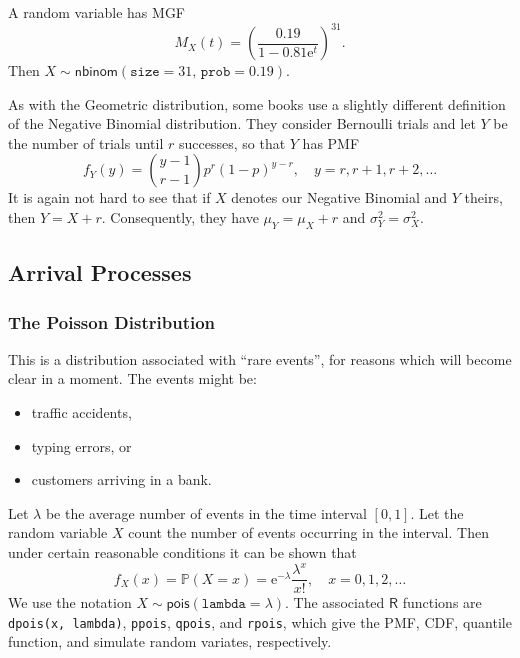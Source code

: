 \documentclass[captions=tableheading]{scrbook}
\begin{document}
\begin{example}
A random variable has MGF
\[
M_{X}(t)=\left(\frac{0.19}{1-0.81\mathrm{e}^{t}}\right)^{31}.
\]
Then \(X\sim\mathsf{nbinom}(\mathtt{size}=31,\,\mathtt{prob}=0.19)\).
\end{example}

\begin{note}
As with the Geometric distribution, some books use a slightly different definition of the Negative Binomial distribution. They consider Bernoulli trials and let \(Y\) be the number of trials until \(r\) successes, so that \(Y\) has PMF
\begin{equation}
f_{Y}(y)={y-1 \choose r-1}p^{r}(1-p)^{y-r},\quad y=r,r+1,r+2,\ldots
\end{equation}
It is again not hard to see that if \(X\) denotes our Negative Binomial and \(Y\) theirs, then \(Y=X+r\). Consequently, they have \(\mu_{Y}=\mu_{X}+r\) and \(\sigma_{Y}^{2}=\sigma_{X}^{2}\).
\end{note}
\subsection{Arrival Processes}
\label{sec-5-6-3}
\label{sec-Arrival-Processes}
\subsubsection{The Poisson Distribution}
\label{sec-5-6-3-1}
\label{sub-The-Poisson-Distribution}


This is a distribution associated with ``rare events'', for reasons which will become clear in a moment. The events might be:
\begin{itemize}
\item traffic accidents,
\item typing errors, or
\item customers arriving in a bank.
\end{itemize}


Let \(\lambda\) be the average number of events in the time interval \([0,1]\). Let the random variable \(X\) count the number of events occurring in the interval. Then under certain reasonable conditions it can be shown that
\begin{equation}
f_{X}(x)=\mathbb{P}(X=x)=\mathrm{e}^{-\lambda}\frac{\lambda^{x}}{x!},\quad x=0,1,2,\ldots
\end{equation}
We use the notation \(X\sim\mathsf{pois}(\mathtt{lambda}=\lambda)\). The associated \(\mathsf{R}\) functions are \texttt{dpois(x, lambda)}, \texttt{ppois}, \texttt{qpois}, and \texttt{rpois}, which give the PMF, CDF, quantile function, and simulate random variates, respectively.
\end{document}
